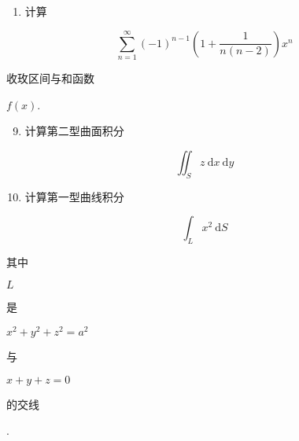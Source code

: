 \documentclass[10pt]{article}
\begin{document}
\begin{enumerate}
  \item \begin{CJK}{UTF8}{mj}计算\end{CJK}

\end{enumerate}
$$
\sum_{n=1}^{\infty}(-1)^{n-1}\left(1+\frac{1}{n(n-2)}\right) x^{n}
$$
\begin{CJK}{UTF8}{mj}收玫区间与和函数\end{CJK} $f(x)$.

\begin{enumerate}
  \setcounter{enumi}{8}
  \item \begin{CJK}{UTF8}{mj}计算第二型曲面积分\end{CJK}
\end{enumerate}
$$
\iint_{S} z \mathrm{~d} x \mathrm{~d} y
$$

\begin{enumerate}
  \setcounter{enumi}{9}
  \item \begin{CJK}{UTF8}{mj}计算第一型曲线积分\end{CJK}
\end{enumerate}
$$
\int_{L} x^{2} \mathrm{~d} S
$$
\begin{CJK}{UTF8}{mj}其中\end{CJK} $L$ \begin{CJK}{UTF8}{mj}是\end{CJK} $x^{2}+y^{2}+z^{2}=a^{2}$ \begin{CJK}{UTF8}{mj}与\end{CJK} $x+y+z=0$ \begin{CJK}{UTF8}{mj}的交线\end{CJK}.
\end{document}
